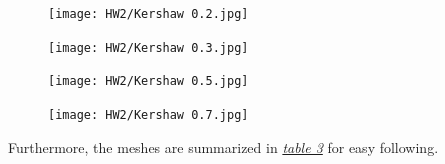 \documentclass[a4paper, 12pt]{article}
\begin{document}
\begin{figure}[h]
\centering
\begin{minipage}{.5\textwidth}
  \centering
  \texttt{[image: HW2/Kershaw 0.2.jpg]}
  \label{mesh5}
\end{minipage}%
\begin{minipage}{.5\textwidth}
  \centering
  \texttt{[image: HW2/Kershaw 0.3.jpg]}
\end{minipage}
\end{figure}
\begin{figure}[h]
\centering
\begin{minipage}{.5\textwidth}
  \centering
  \texttt{[image: HW2/Kershaw 0.5.jpg]}\label{Kershaw Meshes}
\end{minipage}%
\begin{minipage}{.5\textwidth}
  \centering
  \texttt{[image: HW2/Kershaw 0.7.jpg]}
\end{minipage}
\end{figure}


Furthermore, the meshes are summarized in \hyperref[mesh]{\textit{table 3}} for easy following.
\end{document}
